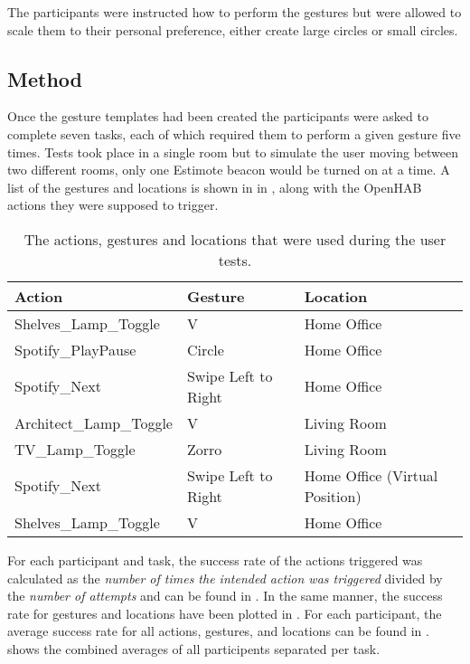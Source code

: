 The participants were instructed how to perform the gestures but were allowed to scale them to their personal preference, \eg either create large circles or small circles.

\subsection{Method}

Once the gesture templates had been created the participants were asked to complete seven tasks, each of which required them to perform a given gesture five times.
Tests took place in a single room but to simulate the user moving between two different rooms, only one Estimote beacon would be turned on at a time.
A list of the gestures and locations is shown in in , along with the OpenHAB actions they were supposed to trigger.

\begin{table}[h]
\centering
\begin{tabular}{|l|l|l|}
\hline
\textbf{Action}         & \textbf{Gesture}    & \textbf{Location}              \\ \hline
Shelves\_Lamp\_Toggle   & V                   & Home Office                    \\ \hline
Spotify\_PlayPause      & Circle              & Home Office                    \\ \hline
Spotify\_Next           & Swipe Left to Right & Home Office                    \\ \hline
Architect\_Lamp\_Toggle & V                   & Living Room                    \\ \hline
TV\_Lamp\_Toggle        & Zorro               & Living Room                    \\ \hline
Spotify\_Next           & Swipe Left to Right & Home Office (Virtual Position) \\ \hline
Shelves\_Lamp\_Toggle   & V                   & Home Office                    \\ \hline
\end{tabular}
\caption{The actions, gestures and locations that were used during the user tests.}
\label{table:user-test-tasks}
\end{table}

For each participant and task, the success rate of the actions triggered was calculated as the \emph{number of times the intended action was triggered} divided by the \emph{number of attempts} and can be found in .
In the same manner, the success rate for gestures and locations have been plotted in .
For each participant, the average success rate for all actions, gestures, and locations can be found in .
 shows the combined averages of all participents separated per task.

